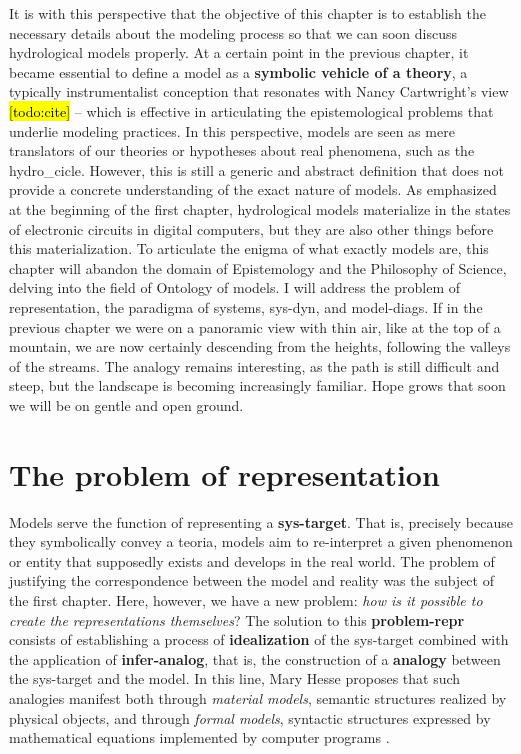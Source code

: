 \documentclass[./main_en.tex]{subfiles}
\begin{document}
\par It is with this perspective that the objective of this chapter is to establish the necessary details about the modeling process so that we can soon discuss hydrological models properly. At a certain point in the previous chapter, it became essential to define a \gls{model} as a \textbf{symbolic vehicle of a theory}, a typically instrumentalist conception that resonates with Nancy Cartwright's view \hl{[todo:cite]} -- which is effective in articulating the epistemological problems that underlie modeling practices. In this perspective, models are seen as mere translators of our theories or hypotheses about real phenomena, such as the \gls{hydro_cicle}. However, this is still a generic and abstract definition that does not provide a concrete understanding of the exact nature of models. As emphasized at the beginning of the first chapter, hydrological models materialize in the states of electronic circuits in digital computers, but they are also other things before this materialization. To articulate the enigma of what exactly models are, this chapter will abandon the domain of Epistemology and the Philosophy of Science, delving into the field of Ontology of models. I will address the problem of representation, the \gls{paradigma} of systems, \gls{sys-dyn}, and \gls{model-diags}. If in the previous chapter we were on a panoramic view with thin air, like at the top of a mountain, we are now certainly descending from the heights, following the valleys of the streams. The \gls{analogy} remains interesting, as the path is still difficult and steep, but the landscape is becoming increasingly familiar. Hope grows that soon we will be on gentle and open ground.

\section{The problem of representation} \label{sec:sys:represent}

\par Models serve the function of representing a \textbf{\gls{sys-target}}. That is, precisely because they symbolically convey a \gls{teoria}, models aim to re-interpret a given phenomenon or entity that supposedly exists and develops in the real world. The problem of justifying the correspondence between the \gls{model} and reality was the subject of the first chapter. Here, however, we have a new problem: \textit{how is it possible to create the representations themselves}? The solution to this \textbf{\gls{problem-repr}} consists of establishing a process of \textbf{\gls{idealization}} of the \gls{sys-target} combined with the application of \textbf{\gls{infer-analog}}, that is, the construction of a \textbf{\gls{analogy}} between the \gls{sys-target} and the \gls{model}. In this line, Mary Hesse proposes that such analogies manifest both through \textit{material models}, semantic structures realized by physical objects, and through \textit{formal models}, syntactic structures expressed by mathematical equations implemented by computer programs \cite{hesse2017}.
\end{document}
